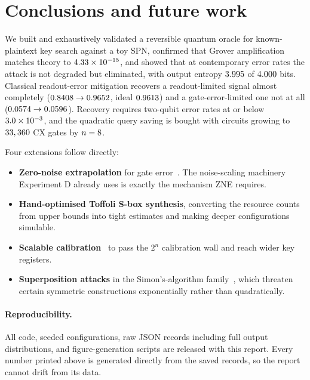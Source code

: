\documentclass[11pt,a4paper]{article}
\begin{document}
\section{Conclusions and future work}

We built and exhaustively validated a reversible quantum oracle for
known-plaintext key search against a toy SPN, confirmed that Grover
amplification matches theory to $4.33\times10^{-15}$, and showed that at
contemporary error rates the attack is not degraded but eliminated, with output
entropy $3.995$ of $4.000$ bits. Classical readout-error mitigation
recovers a readout-limited signal almost completely
($0.8408 \to 0.9652$, ideal $0.9613$) and a gate-error-limited
one not at all ($0.0574 \to 0.0596$). Recovery requires two-qubit error
rates at or below $3.0\times10^{-3}$, and the quadratic query saving is bought
with circuits growing to $33,360$ CX gates by $n = 8$.

Four extensions follow directly:

\begin{itemize}
  \item \textbf{Zero-noise extrapolation} for gate
        error~\citep{temme2017,li2017}. The noise-scaling machinery Experiment D
        already uses is exactly the mechanism ZNE requires.
  \item \textbf{Hand-optimised Toffoli S-box synthesis}, converting the resource
        counts from upper bounds into tight estimates and making deeper
        configurations simulable.
  \item \textbf{Scalable calibration}~\citep{nation2021} to pass the $2^n$
        calibration wall and reach wider key registers.
  \item \textbf{Superposition attacks} in the Simon's-algorithm
        family~\citep{kuwakado2010,kaplan2016}, which threaten certain symmetric
        constructions exponentially rather than quadratically.
\end{itemize}

\paragraph{Reproducibility.} All code, seeded configurations, raw JSON records
including full output distributions, and figure-generation scripts are released
with this report. Every number printed above is generated directly from the
saved records, so the report cannot drift from its data.



\end{document}
